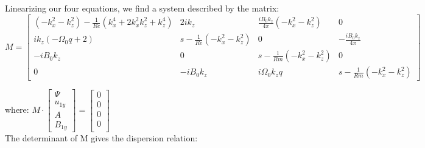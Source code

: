 \documentclass[letterpaper,12pt]{article}
\begin{document}
Linearizing our four equations, we find a system described by the matrix: \\
\begin{equation*}
M = \left[\begin{matrix}
\left(- k_{x}^{2} - k_{z}^{2}\right) - \frac{1}{Re} \left(k_{x}^{4} + 2 k_{x}^{2} k_{z}^{2} + k_{z}^{4}\right) & 2 i k_{z} & \frac{i B_{0} k_{z}}{4 \pi} \left(- k_{x}^{2} - k_{z}^{2}\right) & 0\\

i k_{z} \left(- \Omega_{0} q + 2\right) & s - \frac{1}{Re} \left(- k_{x}^{2} - k_{z}^{2}\right) & 0 & - \frac{i B_{0} k_{z}}{4 \pi}\\

-i B_{0} k_{z} & 0 & s - \frac{1}{Rm} \left(- k_{x}^{2} - k_{z}^{2}\right) & 0\\

0 & - i B_{0} k_{z} & i \Omega_{0} k_{z} q & s - \frac{1}{Rm} \left(- k_{x}^{2} - k_{z}^{2}\right)

\end{matrix}\right] 
\end{equation*}

where: 
$M \cdot \left[\begin{matrix}

\Psi \\
u_{1y}\\
A\\
B_{1y}

\end{matrix}\right] = \left[\begin{matrix}
0 \\
0\\
0\\
0\\
\end{matrix}\right]
$ \\

The determinant of M gives the dispersion relation: \\
\end{document}
